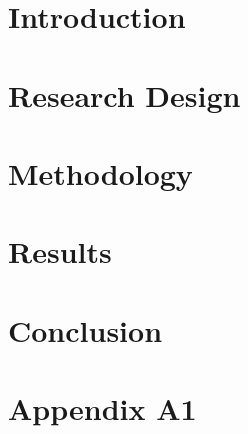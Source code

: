 \documentclass{article}%
\begin{document}

    \tableofcontents 

     \newpage
{}%

\section{Introduction}
    \blindtext
\section{Research Design}
    \blindtext

\section{Methodology}
    \blindtext
\section{Results}
    \blindtext
\section{Conclusion}
    \blindtext

\appendix
\appendixpage
{}
\section{Appendix A1}
    \blindtext
\end{document}
